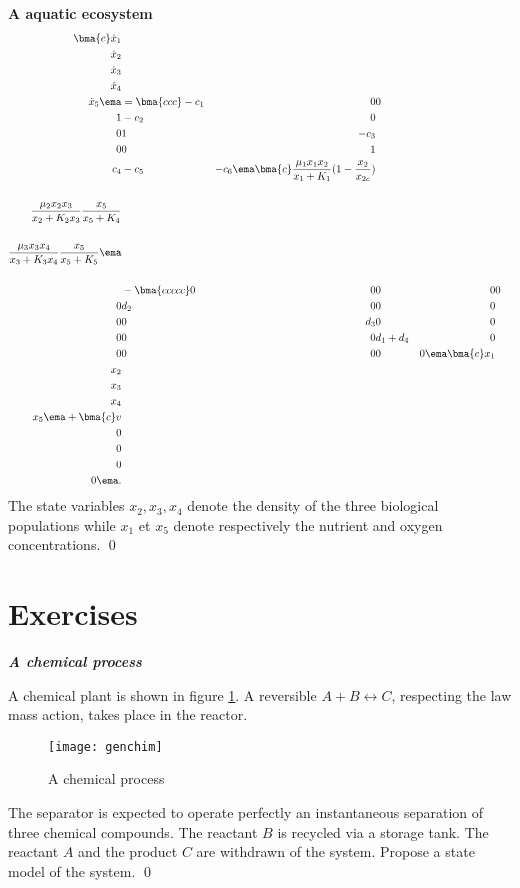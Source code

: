 \begin{exemple} {\bf A aquatic ecosystem}
\begin{equation*} \begin{split}
\bma{c}  \dot x_1 \\ \dot x_2 \\
\dot x_3 \\ \dot x_4 \\ \dot x_5 \ema &= \bma{ccc} -c_1 & 0 & 0\\ 1 & -c_2
& 0 \\ 0 & 1 & -c_3 \\ 0 & 0 & 1 \\ c_4 & -c_5 & -c_6 \ema \bma{c}
\frac{{\textstyle \mu_1 x_1 x_2}}{{\textstyle x_1 + K_1}}(1 -
\frac{{\textstyle x_2}}{{\textstyle x_{2c}}}) \\ 
\\
\frac{{\textstyle \mu_2 x_2 x_3}}{{\textstyle x_2 + K_2x_3}}  \frac{{\textstyle
x_5}}{{\textstyle x_5 +K_4}} \\
\\
\frac{{\textstyle \mu_3 x_3 x_4}}{{\textstyle x_3 + K_3x_4}} \frac{{\textstyle
x_5}}{{\textstyle x_5 +K_5}}
\ema 
\\ & \\&- \bma{ccccc} 0 & 0 & 0 &
0 & 0 \\ 0 & d_2 & 0 & 0 & 0 \\0 & 0 & d_3 & 0 & 0  \\0 & 0 & 0 & d_1 + d_4 & 0
\\0 & 0 & 0 & 0 & 0
\ema \bma{c} x_1 \\  x_2 \\  x_3 \\  x_4 \\ x_5 \ema + \bma{c} v \\ 0  \\ 0 \\
0 \\ 0 \ema.    
\end{split} \end{equation*}
The state variables $x_2,x_3,x_4$ denote the density of the three biological populations 
while $x_1$ et $x_5$ denote respectively the nutrient and oxygen concentrations. \qed
\end{exemple}
 
\section{Exercises}
	
\begin{exercice}{\bf \em A chemical process}

A chemical plant is shown in figure \ref{Fig:genchim}.
A reversible $A+B \leftrightarrow C$, respecting the law mass action, takes place in the reactor.
\begin{figure}[htbp]
\centering
\texttt{[image: genchim]}
\caption{A chemical process}
\label{Fig:genchim}
\end{figure}
The separator is expected to operate perfectly an instantaneous separation of three chemical compounds.
The reactant $B$ is recycled via a storage tank.
The reactant $A$ and the product $C$ are withdrawn of the system.
Propose a state model of the system. \qed
\end{exercice}
\vv


